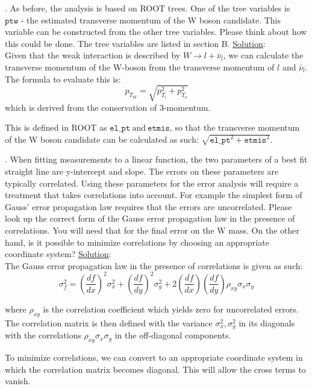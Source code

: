 \documentclass[a4paper]{report}
\numberwithin{equation}{section}
\begin{document}
. As before, the analysis is based on ROOT trees. One of the tree variables is $\texttt{ptw -}$  the estimated transverse momentum of the W boson candidate. This variable can be constructed from the other tree variables. Please think about how this could be done. The tree variables are listed in section B.
\bigbreak
\noindent \underline{Solution}: \\
\noindent Given that the weak interaction is described by $W \rightarrow l + \bar{\nu}_l$, we can calculate the transverse momentum of the W-boson from the transverse momentum of $l$ and $\bar{\nu}_l$.  The formula to evaluate this is:
$$p_{T_W} = \sqrt{p_{T_l}^2 + p_{T_\nu}^2}  $$
which is derived from the conservation of 3-momentum.

\noindent This is defined in ROOT as $\texttt{el\_pt} \ \text{and} \ \texttt{etmis}$, so that the transverse momentum of the W boson candidate can be calculated as such: $\sqrt{\texttt{el\_{pt}}^2 + \texttt{etmis}^2}$.

\bigbreak 

.  When fitting measurements to a linear function, the two parameters of a best fit straight line are y-intercept and slope. The errors on these parameters are typically correlated. Using these parameters for the error analysis will require a treatment that takes correlations into account. For example the simplest form of Gauss’ error propagation law requires that the errors are uncorrelated. Please look up the correct form of the Gauss error propagation law in the presence of correlations. You will need that for the final error on the W mass. On the other hand, is it possible to minimize correlations by choosing an appropriate coordinate system?
\bigbreak
\noindent \underline{Solution}: \\
\noindent The Gauss error propagation law in the presence of correlations is given as such:
$$
	\sigma_f ^2 = \left( \frac{df}{dx} \right)^2 \sigma_x^2 + \left( \frac{df}{dy} \right)^2 \sigma_y^2 + 2 \left( \frac{df}{dx} \right) \left( \frac{df}{dy} \right) \rho_{xy} \sigma_{x} \sigma_y $$
	
\noindent where $\rho_{xy}$ is the correlation coefficient which yields zero for uncorrelated errors. The correlation matrix is then defined with the variance $\sigma_x^2, \sigma_y^2$ in its diagonals with the correlations $\rho_{xy} \sigma_x \sigma_y$ in the off-diagonal components.

\noindent To minimize correlations, we can convert to an appropriate coordinate system in which the correlation matrix becomes diagonal. This will allow the cross terms to vanish.
\end{document}
